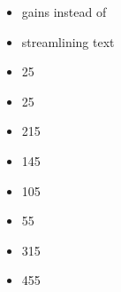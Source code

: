 \clearpage
{}

\subtitle{2023 \betaname{} 2}

\begin{itemize}
	\item \hurlattack{} gains \quicktofire{} instead of \marchandshoot{} \wordand{} 
	\item streamlining text
	\item \inscribingburin{} 25 
	\item \beastlord{} \huntingcall{} 25 
	\item \minotaurchieftain{} \basecost{} 215 
	\item \longhornherd{} \basecost{} 145 
	\item \raidingchariot{} \extramodel{} 105 
	\item \razortuskherd{} \extramodel{} 55 
	\item \cyclops{} \basecost{} 315 
	\item \gortach{} \basecost{} 455 
\end{itemize}
